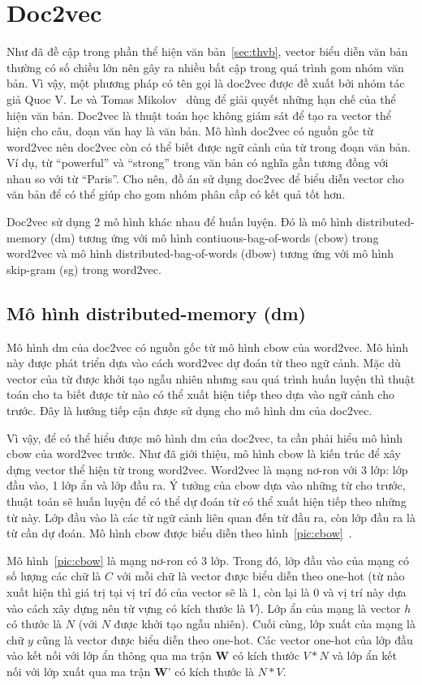 \section{Doc2vec}
Như đã đề cập trong phần thể hiện văn bản~\ref{sec:thvb}, vector biểu diễn văn bản thường có số chiều lớn nên gây ra nhiều bất cập trong quá trình gom nhóm văn bản.
Vì vậy, một phương pháp có tên gọi là doc2vec được đề xuất bởi nhóm tác giả Quoc V. Le và Tomas Mikolov~\cite{doc2vec-original} dùng để giải quyết những hạn chế của thể hiện văn bản.
Doc2vec là thuật toán học không giám sát để tạo ra vector thể hiện cho câu, đoạn văn hay là văn bản.
Mô hình doc2vec có nguồn gốc từ word2vec nên doc2vec còn có thể biết được ngữ cảnh của từ trong đoạn văn bản. 
Ví dụ, từ ``powerful'' và ``strong'' trong văn bản có nghĩa gần tương đồng với nhau so với từ ``Paris''.
Cho nên, đồ án sử dụng doc2vec để biểu diễn vector cho văn bản để có thể giúp cho gom nhóm phân cấp có kết quả tốt hơn.

Doc2vec sử dụng 2 mô hình khác nhau để huấn luyện.
Đó là mô hình distributed-memory (dm) tương ứng với mô hình contiuous-bag-of-words (cbow) trong word2vec và mô hình distributed-bag-of-words (dbow) tương ứng với mô hình skip-gram (sg) trong word2vec. 

\subsection{Mô hình distributed-memory (dm)}
Mô hình dm của doc2vec có nguồn gốc từ mô hình cbow của word2vec.
Mô hình này được phát triển dựa vào cách word2vec dự đoán từ theo ngữ cảnh.
Mặc dù vector của từ được khởi tạo ngẫu nhiên nhưng sau quá trình huấn luyện thì thuật toán cho ta biết được từ nào có thể xuất hiện tiếp theo dựa vào ngữ cảnh cho trước.
Đây là hướng tiếp cận được sử dụng cho mô hình dm của doc2vec.

Vì vậy, để có thể hiểu được mô hình dm của doc2vec, ta cần phải hiểu mô hình cbow của word2vec trước.
Như đã giới thiệu, mô hình cbow là kiến trúc để xây dựng vector thể hiện từ trong word2vec.
Word2vec là mạng nơ-ron với 3 lớp: lớp đầu vào, 1 lớp ẩn và lớp đầu ra.
Ý tưởng của cbow dựa vào những từ cho trước, thuật toán sẽ huấn luyện để có thể dự đoán từ có thể xuất hiện tiếp theo những từ này.
Lớp đầu vào là các từ ngữ cảnh liên quan đến từ đầu ra, còn lớp đầu ra là từ cần dự đoán.
Mô hình cbow được biểu diễn theo hình~\ref{pic:cbow}~\cite{word2vec-cbow}.

Mô hình~\ref{pic:cbow} là mạng nơ-ron có 3 lớp.
Trong đó, lớp đầu vào của mạng có số lượng các chữ là $C$ với mỗi chữ là vector được biểu diễn theo one-hot (từ nào xuất hiện thì giá trị tại vị trí đó của vector sẽ là 1, còn lại là 0 và vị trí này dựa vào cách xây dựng nên từ vựng có kích thước là $V$).
Lớp ẩn của mạng là vector $h$ có thước là $N$ (với $N$ được khởi tạo ngẫu nhiên).
Cuối cùng, lớp xuất của mạng là chữ $y$ cũng là vector được biểu diễn theo one-hot.
Các vector one-hot của lớp đầu vào kết nối với lớp ẩn thông qua ma trận $\textbf{W}$ có kích thước $V * N$ và lớp ẩn kết nối với lớp xuất qua ma trận $\textbf{W'}$ có kích thước là $N * V$.

